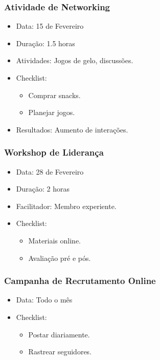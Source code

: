 \documentclass[12pt]{article}
\begin{document}
\subsubsection{Atividade de Networking}
\begin{itemize}
    \item Data: 15 de Fevereiro
    \item Duração: 1.5 horas
    \item Atividades: Jogos de gelo, discussões.
    \item Checklist:
      \begin{itemize}
        \item Comprar snacks.
        \item Planejar jogos.
      \end{itemize}
    \item Resultados: Aumento de interações.
\end{itemize}

\subsubsection{Workshop de Liderança}
\begin{itemize}
    \item Data: 28 de Fevereiro
    \item Duração: 2 horas
    \item Facilitador: Membro experiente.
    \item Checklist:
      \begin{itemize}
        \item Materiais online.
        \item Avaliação pré e pós.
      \end{itemize}
\end{itemize}

\subsubsection{Campanha de Recrutamento Online}
\begin{itemize}
    \item Data: Todo o mês
    \item Checklist:
      \begin{itemize}
        \item Postar diariamente.
        \item Rastrear seguidores.
      \end{itemize}
\end{itemize}
\end{document}
